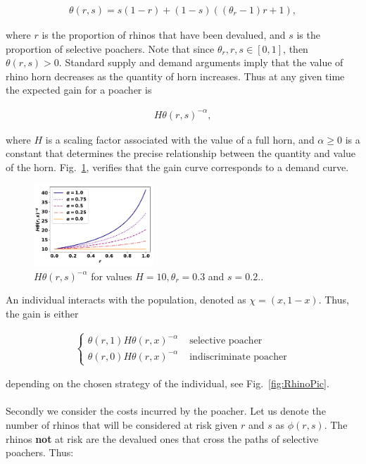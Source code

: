 \documentclass[10pt]{article}
\begin{document}
\begin{eqnarray}
	\label{eqn:theta}
	\theta(r, s) = s (1 - r) + (1 - s) ((\theta_r - 1) r + 1),
\end{eqnarray}

where \(r\) is the proportion of rhinos that have been devalued, and \(s\) is the 
proportion of selective poachers. Note that since \(\theta_r, r, s  \in [0, 1]\), then
\(\theta(r, s) > 0\). Standard supply and demand arguments imply that the value
of rhino horn decreases as the quantity of horn increases. Thus at any given time
the expected gain for a poacher is

\begin{eqnarray}
	\label{eqn:individual_gain}
 	H \theta(r,s)^{-\alpha},
\end{eqnarray}

where \(H\) is a scaling factor associated with the value of a full horn, and 
\(\alpha \geq 0\) is a constant that determines the precise relationship between
the quantity and value of the horn.  Fig.~\ref{fig:GainCurve}, verifies that the 
gain curve corresponds to a demand curve.

\begin{figure}[!htbp]
\centering
\includegraphics[width=0.4\textwidth]{images/gain_curve.pdf}
\caption{\label{fig:GainCurve} \(H \theta(r, s) ^{- \alpha}\) for values 
\(H = 10, \theta_r = 0.3\) and \(s = 0.2.\).}
\end{figure}

An individual interacts with the population, denoted as \(\chi=(x, 1 -x )\). Thus,
the gain is either

\begin{eqnarray}
	\label{eqn:gain}
	\left\{
	\begin{array}{cl}
	\theta(r, 1) H \theta(r, x)^{-\alpha} & \mbox{ selective poacher}
	\\
	\theta(r, 0) H \theta(r, x)^{-\alpha} & \mbox{ indiscriminate poacher}
	\end{array} \right.
\end{eqnarray}

depending on the chosen strategy of the individual, see Fig.~\ref{fig:RhinoPic}.
\\
\\
Secondly we consider the costs incurred by the poacher. Let us denote the number
of rhinos that will be considered at risk given \(r\) and \(s\) as \(\phi(r,s)\).
The rhinos \textbf{not} at risk are the devalued ones 
that cross the paths of selective poachers. Thus:
\end{document}
